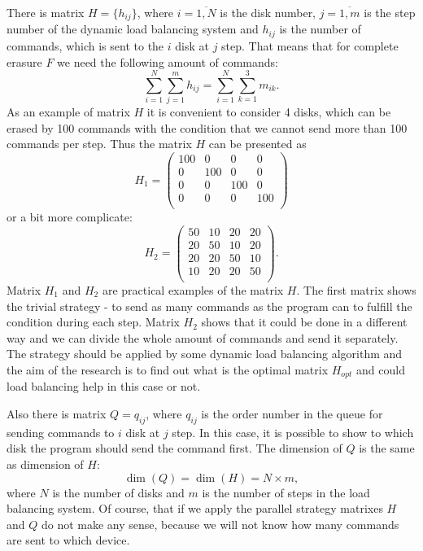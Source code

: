 There is matrix $H=\{h_{ij}\}$, where $i=\overline{1,N}$ is the disk number, $j=\overline{1,m}$ is the step number of the dynamic load balancing system and $h_{ij}$ is the number of commands, which is sent to the $i$ disk at $j$ step. That means that for complete erasure $F$ we need the following amount of commands:
\begin{equation}
\label{eq:load_balancing_matrix}
	\sum_{i=1}^{N}\sum_{j=1}^{m}h_{ij} = \sum_{i=1}^{N}\sum_{k=1}^{3}m_{ik}.
\end{equation}
As an example of matrix $H$ it is convenient to consider 4 disks, which can be erased by 100 commands with the condition that we cannot send more than 100 commands per step. Thus the matrix $H$ can be presented as 
\begin{equation}
	H_1 =
	\begin{pmatrix}
		100 & 0 & 0 & 0 \\
		0 & 100 & 0 & 0 \\
		0 & 0 & 100 & 0 \\
		0 & 0 & 0 & 100 \\
	\end{pmatrix}
\end{equation}
or a bit more complicate:
\begin{equation}
	H_2 =
	\begin{pmatrix}
		50 & 10 & 20 & 20 \\
		20 & 50 & 10 & 20 \\
		20 & 20 & 50 & 10 \\
		10 & 20 & 20 & 50 \\
	\end{pmatrix}.
\end{equation}
Matrix $H_1$ and $H_2$ are practical examples of the matrix $H$. The first matrix shows the trivial strategy - to send as many commands as the program can to fulfill the condition during each step. Matrix $H_2$ shows that it could be done in a different way and we can divide the whole amount of commands and send it separately. The strategy should be applied by some dynamic load balancing algorithm and the aim of the research is to find out what is the optimal matrix $H_{opt}$ and could load balancing help in this case or not.

Also there is matrix $Q=q_{ij}$, where $q_{ij}$ is the order number in the queue for sending commands to $i$ disk at $j$ step. In this case, it is possible to show to which disk the program should send the command first. The dimension of $Q$ is the same as dimension of $H$: 
\begin{equation}
	\dim(Q) = \dim(H) = N \times m,
\end{equation}
where $N$ is the number of disks and $m$ is the number of steps in the load balancing system. Of course, that if we apply the parallel strategy matrixes $H$ and $Q$ do not make any sense, because we will not know how many commands are sent to which device. 

